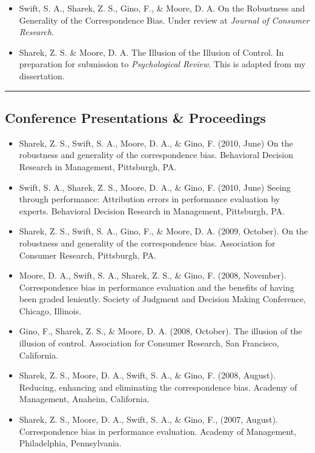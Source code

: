 \documentclass[12pt,letterpaper,oneside]{article}
\begin{document}
\begin{itemize}
	\parskip=0.1em
	\item Swift, S. A., Sharek, Z. S., Gino, F., \& Moore, D. A. On the Robustness and Generality of the
	Correspondence Bias. Under review at \emph{Journal of Consumer Research}.	
\end{itemize}

\begin{itemize}
	\parskip=0.1em
	\item Sharek, Z. S. \& Moore, D. A. The Illusion of the Illusion of Control. 
	In preparation for submission to \emph{Psychological Review}. This is adapted from my dissertation.	
\end{itemize}

\hrule
\vspace{-0.4em}
\subsection*{\centering\textbf{Conference Presentations \& Proceedings}}

\begin{itemize}
\parskip=0.1em
\item Sharek, Z. S., Swift, S. A., Moore, D. A., \& Gino, F. (2010, June) On the robustness and generality of the correspondence bias. Behavioral Decision Research in Management, Pittsburgh, PA. 
\item Swift, S. A., Sharek, Z. S., Moore, D. A., \& Gino, F. (2010, June) Seeing through performance: Attribution errors in performance evaluation by experts. Behavioral Decision Research in Management, Pittsburgh, PA.
\item Sharek, Z. S., Swift, S. A., Gino, F., \& Moore, D. A. (2009, October). On the robustness and generality of the correspondence bias. Association for Consumer Research, Pittsburgh, PA.
\item Moore, D. A., Swift, S. A., Sharek, Z. S., \& Gino, F. (2008, November). Correspondence bias in 
performance evaluation and the benefits of having been graded leniently. Society of Judgment and Decision Making Conference, Chicago, Illinois.   
\item Gino, F., Sharek, Z. S., \& Moore, D. A. (2008, October).  The illusion of the illusion of control.  
Association for Consumer Research, San Francisco, California.   
\item Sharek, Z. S., Moore, D. A., Swift, S. A., \& Gino, F. (2008, August). Reducing, enhancing and eliminating the correspondence bias. Academy of Management, Anaheim, California.
\item Sharek, Z. S., Moore, D. A., Swift, S. A., \& Gino, F., (2007, August).  Correspondence bias in 
performance evaluation.  Academy of Management, Philadelphia, Pennsylvania.  
\end{itemize}
\end{document}
